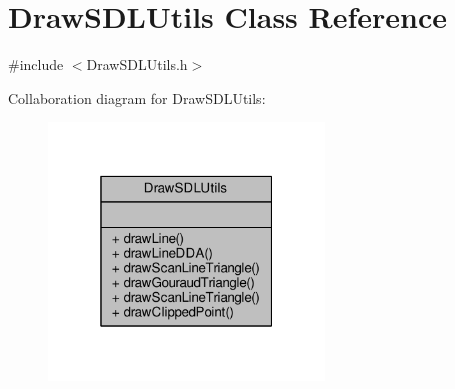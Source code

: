 \hypertarget{classDrawSDLUtils}{\section{Draw\-S\-D\-L\-Utils Class Reference}
\label{classDrawSDLUtils}
}


{\ttfamily \#include $<$Draw\-S\-D\-L\-Utils.\-h$>$}



Collaboration diagram for Draw\-S\-D\-L\-Utils\-:
\nopagebreak
\begin{figure}[H]
\begin{center}
\leavevmode
\includegraphics[width=208pt]{classDrawSDLUtils__coll__graph}
\end{center}
\end{figure}
